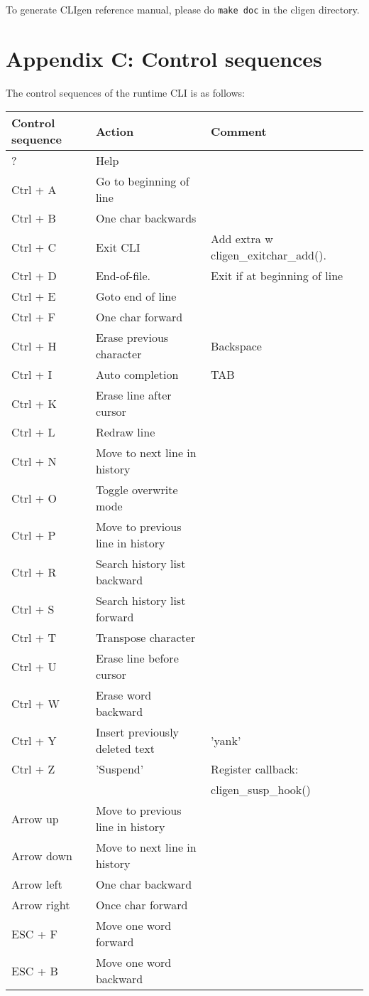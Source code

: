 \documentclass[a4paper, 10pt] {article}
\begin{document}
To generate CLIgen reference manual, please do {\tt make doc} in the cligen directory.

\newpage
\section*{Appendix C: Control sequences}
\label{app:control}
The control sequences of the runtime CLI is as follows:


\begin{tabular}{ | l | l | l | }
\hline
  \textbf{ Control sequence} & \textbf{Action} & \textbf{Comment} \\
\hline
? & Help & \\
\hline
Ctrl + A & Go to beginning of line & \\
\hline
Ctrl + B & One char backwards & \\
\hline
Ctrl + C & Exit CLI & Add extra w cligen\_exitchar\_add().\\
\hline
Ctrl + D & End-of-file. & Exit if at beginning of line \\
\hline
Ctrl + E & Goto end of line & \\
\hline
Ctrl + F & One char forward & \\
\hline
Ctrl + H & Erase previous character & Backspace\\
\hline
Ctrl + I & Auto completion & TAB \\
\hline
Ctrl + K & Erase line after cursor & \\
\hline
Ctrl + L & Redraw line & \\
\hline
Ctrl + N & Move to next line in history & \\
\hline
Ctrl + O & Toggle overwrite mode & \\
\hline
Ctrl + P & Move to previous line in history & \\
\hline
Ctrl + R & Search history list backward & \\
\hline
Ctrl + S & Search history list forward & \\
\hline
Ctrl + T & Transpose character & \\
\hline
Ctrl + U & Erase line before cursor & \\
\hline
Ctrl + W & Erase word backward & \\
\hline
Ctrl + Y & Insert previously deleted text& 'yank' \\
\hline
Ctrl + Z & 'Suspend' & Register callback: \\&&cligen\_susp\_hook() \\
\hline
Arrow up & Move to previous line in history & \\
\hline
Arrow down & Move to next line in history & \\
\hline
Arrow left & One char backward & \\
\hline
Arrow right & Once char forward & \\
\hline
ESC + F & Move one word forward & \\
\hline
ESC + B & Move one word backward & \\
\hline
\end{tabular}
\end{document}
